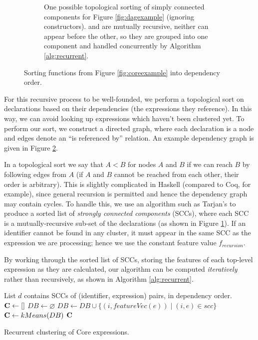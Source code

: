 \begin{figure}
\begin{subfigure}{\textwidth}
    \caption{One possible topological sorting of simply connected components for Figure \ref{fig:dagexample} (ignoring constructors).  and  are mutually recursive, neither can appear before the other, so they are grouped into one component and handled concurrently by Algorithm \ref{alg:recurrent}.}
    \label{fig:sccexample}
  \end{subfigure}
  \caption{Sorting functions from Figure \ref{fig:coreexample} into dependency order.}
  \label{fig:dependencyexample}
\end{figure}

For this recursive process to be well-founded, we perform a topological sort on declarations based on their dependencies (the expressions they reference). In this way, we can avoid looking up expressions which haven't been clustered yet. To perform our sort, we construct a directed graph, where each declaration is a node and edges denote an ``is referenced by'' relation. An example dependency graph is given in Figure \ref{fig:dependencyexample}.

In a topological sort we say that $A < B$ for nodes $A$ and $B$ if we can reach $B$ by following edges from $A$ (if $A$ and $B$ cannot be reached from each other, their order is arbitrary). This is slightly complicated in Haskell (compared to Coq, for example), since general recursion is permitted and hence the dependency graph may contain cycles. To handle this, we use an algorithm such as Tarjan's \cite{tarjan1972depth} to produce a sorted list of \emph{strongly connected components} (SCCs), where each SCC is a mutually-recursive sub-set of the declarations (as shown in Figure \ref{fig:sccexample}). If an identifier cannot be found in any cluster, it must appear in the same SCC as the expression we are processing; hence we use the constant feature value $f_{recursion}$.

By working through the sorted list of SCCs, storing the features of each top-level expression as they are calculated, our algorithm can be computed \emph{iteratively} rather than recursively, as shown in Algorithm \ref{alg:recurrent}.

\begin{algorithm}
  \begin{algorithmic}[1]
    \Require List $d$ contains SCCs of (identifier, expression) pairs, in dependency order.
      \State $\mathbf{C}  \gets []$
      \State $DB \gets \varnothing$
        \State $DB \gets DB \cup \{(i, featureVec(e)) \mid (i, e) \in scc\}$
        \State $\mathbf{C}  \gets kMeans(DB)$
      \EndFor
      \Return $\mathbf{C}$
    \EndProcedure
  \end{algorithmic}
  \caption{Recurrent clustering of Core expressions.}
  \label{alg:recurrent}
\end{algorithm}

